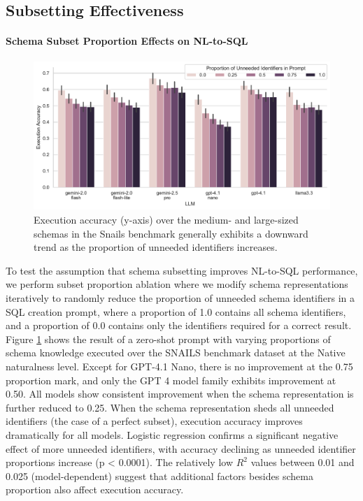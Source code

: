 \subsection{Subsetting Effectiveness}

\paragraph{\textbf{Schema Subset Proportion Effects on NL-to-SQL}}

\begin{figure}
  \centering
  \includegraphics[width=\linewidth]{./figures/execution_accuracy_by_identifier_proportion_barplot.pdf}
  \caption{Execution accuracy (y-axis) over the medium- and large-sized schemas in the Snails benchmark generally exhibits a downward trend as the proportion of unneeded identifiers increases.}
  \label{fig:schema-reduction-graph}
\end{figure}

To test the assumption that schema subsetting improves NL-to-SQL performance, we perform subset proportion ablation where we modify schema representations iteratively to randomly reduce the proportion of unneeded schema identifiers in a SQL creation prompt, where a proportion of 1.0 contains all schema identifiers, and a proportion of 0.0 contains only the identifiers required for a correct result.
Figure \ref{fig:schema-reduction-graph} shows the result of a zero-shot prompt with varying proportions of schema knowledge executed over the SNAILS benchmark dataset at the Native naturalness level.
Except for GPT-4.1 Nano, there is no improvement at the 0.75 proportion mark, and only the GPT 4 model family exhibits improvement at 0.50. All models show consistent improvement when the schema representation is further reduced to 0.25. 
When the schema representation sheds all unneeded identifiers (the case of a perfect subset), execution accuracy improves dramatically for all models.
Logistic regression confirms a significant negative effect of more unneeded identifiers, with accuracy declining as unneeded identifier proportions increase (p < 0.0001).
The relatively low $R^2$ values between 0.01 and 0.025 (model-dependent) suggest that additional factors besides schema proportion also affect execution accuracy.

